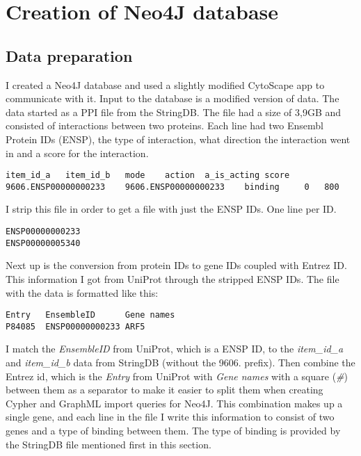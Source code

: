 \chapter{Creation of Neo4J database} %
\section{Data preparation}
I created a Neo4J database and used a slightly modified CytoScape app to
communicate with it. Input to the database is a modified version of data. The
data started as a PPI file from the StringDB. The file had a size of 3,9GB and
consisted of interactions between two proteins. Each line had two Ensembl
Protein IDs (ENSP), the type of interaction, what direction the interaction went
in and a score for the interaction. 

\begin{verbatim}
item_id_a	item_id_b	mode	action	a_is_acting	score
9606.ENSP00000000233	9606.ENSP00000000233	binding		0	800
\end{verbatim}

I strip this file in order to get a file with just the ENSP IDs. One line per
ID.

\begin{verbatim}
ENSP00000000233
ENSP00000005340
\end{verbatim}

Next up is the conversion from protein IDs to gene IDs coupled with Entrez ID.
This information I got from UniProt through the stripped ENSP IDs. The file with
the data is formatted like this:

\begin{verbatim}
Entry	EnsembleID	    Gene names
P84085	ENSP00000000233	ARF5
\end{verbatim}

I match the \textit{EnsembleID} from UniProt, which is a ENSP ID, to the
\textit{item\_id\_a} and \textit{item\_id\_b} data from StringDB (without the
9606.  prefix). Then combine the Entrez id, which is the \textit{Entry} from
UniProt with \textit{Gene names} with a square (\textit{\#}) between them as
a separator to make it easier to split them when creating Cypher and GraphML
import queries for Neo4J. This combination makes up a single gene, and each line
in the file I write this information to consist of two genes and a type of
binding between them. The type of binding is provided by the StringDB file
mentioned first in this section. %


